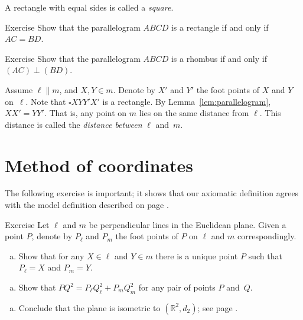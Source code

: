 A rectangle with equal sides is called a \emph{square}.

\begin{thm}{Exercise}\label{ex:rectangle}
Show that the parallelogram $ABCD$ is a rectangle
if and only if $AC=BD$.
\end{thm}

\begin{thm}{Exercise}\label{ex:romb2}
Show that the parallelogram $ABCD$ is a rhombus
if and only if $(AC)\perp (BD)$.
\end{thm}

Assume $\ell\parallel m$, and $X,Y\in m$.
Denote by $X'$ and $Y'$ the foot points of $X$ and $Y$ on~$\ell$.
Note that $\square XYY'X'$ is a rectangle.
By Lemma~\ref{lem:parallelogram}, $XX'=YY'$.
That is, any point on $m$ lies on the same distance from $\ell$.
This distance is called the \emph{distance between} $\ell$ and~$m$.


\section*{Method of coordinates}

The following exercise is important;
it shows that our axiomatic definition agrees with the model definition described on page \pageref{def:d_2}.


\begin{thm}{Exercise}\label{ex:coordinates} 
Let $\ell$ and $m$ be perpendicular lines in the Euclidean plane.
Given a point $P$,  denote by $P_\ell$ and $P_m$ the foot points of $P$ on $\ell$ and $m$ correspondingly.


\begin{enumerate}[(a)]
\item Show that for any $X\in \ell$ and $Y\in m$ there is a unique point $P$ such that $P_\ell=X$ and $P_m=Y$.
\end{enumerate}

\begin{enumerate}[(a)]\addtocounter{enumi}{1}
\item
Show that 
$PQ^2=P_\ell Q_\ell^2+P_mQ_m^2$
for any pair of points $P$ and~$Q$.
\end{enumerate}

\begin{enumerate}[(a)]\addtocounter{enumi}{2}
\item Conclude that the plane is isometric to $(\mathbb{R}^2,d_2)$; see page \pageref{def:d_2}.
\end{enumerate}

\end{thm}

